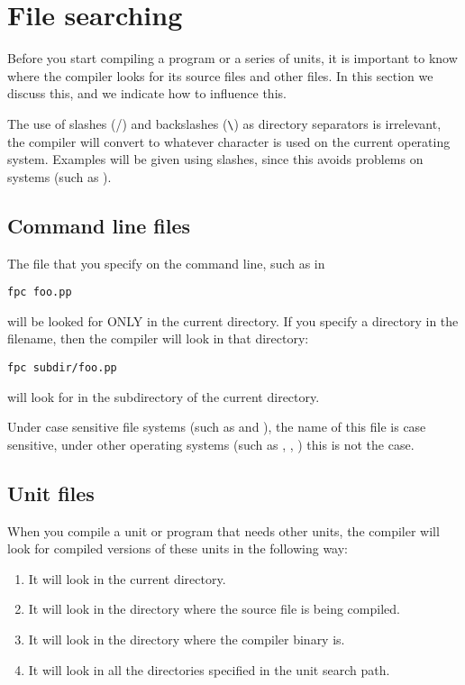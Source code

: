 \section{File searching}
Before you start compiling a program or a series of units, it is
important to know where the compiler looks for its source files and other
files. In this section we discuss this, and we indicate how to influence
this.

\begin{remark}
The use of slashes (/) and backslashes (\verb+\+) as directory separators
is irrelevant, the compiler will convert to whatever character is used on
the current operating system. Examples will be given using slashes, since
this avoids problems on \unix systems (such as \linux).
\end{remark}

\subsection{Command line files}
The file that you specify on the command line, such as in
\begin{verbatim}
fpc foo.pp
\end{verbatim}
will be looked for ONLY in the current directory. If you specify a directory
in the filename, then the compiler will look in that directory:
\begin{verbatim}
fpc subdir/foo.pp
\end{verbatim}
will look for  in the subdirectory  of the current
directory.

Under case sensitive file systems (such as \linux and \unix), the name of this 
file is case sensitive, under other operating systems (such as \dos, \windowsnt, \ostwo) 
this is not the case.

\subsection{Unit files}

When you compile a unit or program that needs other units, the compiler will
look for compiled versions of these units in the following way:
\begin{enumerate}
\item It will look in the current directory.
\item It will look in the directory where the source file is being compiled.
\item It will look in the directory where the compiler binary is.
\item It will look in all the directories specified in the unit search path.
\end{enumerate}

